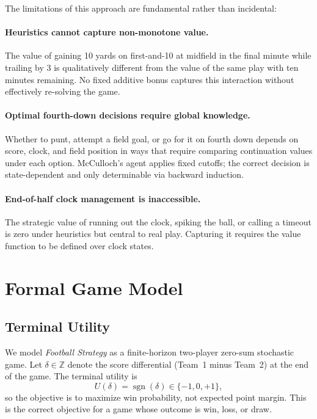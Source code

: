 \documentclass[11pt,letterpaper]{article}
\begin{document}
The limitations of this approach are fundamental rather than incidental:

\paragraph{Heuristics cannot capture non-monotone value.}
The value of gaining 10 yards on first-and-10 at midfield in the final minute while
trailing by 3 is qualitatively different from the value of the same play with ten minutes
remaining.  No fixed additive bonus captures this interaction without effectively
re-solving the game.

\paragraph{Optimal fourth-down decisions require global knowledge.}
Whether to punt, attempt a field goal, or go for it on fourth down depends on score,
clock, and field position in ways that require comparing continuation values under each
option.  McCulloch's agent applies fixed cutoffs; the correct decision is state-dependent
and only determinable via backward induction.

\paragraph{End-of-half clock management is inaccessible.}
The strategic value of running out the clock, spiking the ball, or calling a timeout is
zero under heuristics but central to real play.  Capturing it requires the value function
to be defined over clock states.

\section{Formal Game Model}
\label{sec:model}

\subsection{Terminal Utility}

We model \emph{Football Strategy} as a finite-horizon two-player zero-sum stochastic game.
Let $\delta \in \mathbb{Z}$ denote the score differential (Team~1 minus Team~2) at the end
of the game.  The terminal utility is
\[
  U(\delta) = \operatorname{sgn}(\delta) \in \{-1, 0, +1\},
\]
so the objective is to maximize win probability, not expected point margin.  This is the
correct objective for a game whose outcome is win, loss, or draw.
\end{document}
